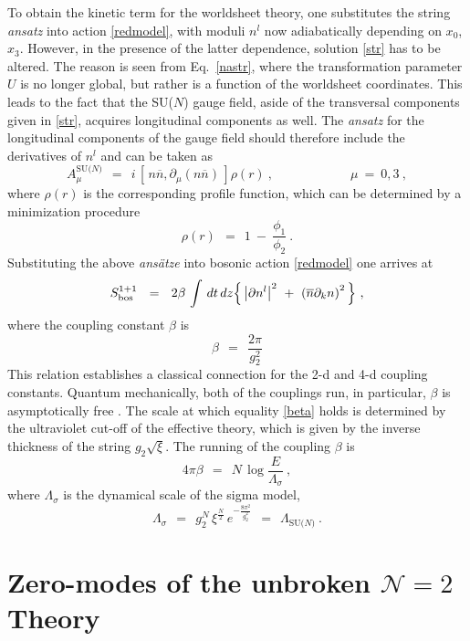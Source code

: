 \documentclass[12pt]{article}
\def\beq{\begin{equation}}
\def\eeq{\end{equation}}
\newcommand{\ntwo}{${\mathcal N}=2$ }
\newcommand{\p}{\partial}
\newcommand{\ov}{\overline}
\newcommand{\LN}{\Lambda_\text{SU($N$)}}
\newcommand{\nbar}{\ov{n}}
\begin{document}
	To obtain the kinetic term for the worldsheet theory, one substitutes the string {\it ansatz}
	into action \eqref{redmodel}, with moduli $ n^l $ now adiabatically
	depending on $ x_0 $, $ x_3 $.
	However, in the presence of the latter dependence, solution \eqref{str} has to be altered.
	The reason is seen from Eq.~\eqref{nastr}, where the transformation parameter 
	$ U $ is no longer global, but rather is a function of the worldsheet coordinates.
	This leads to the fact that the SU($N$) gauge field, aside of the transversal components
	given in \eqref{str}, acquires longitudinal components as well.
	The {\it ansatz} for the longitudinal components of the gauge field should
	therefore include the derivatives of $ n^l $ and can be taken as 
\[
	A_\mu^\text{SU($N$)} ~~=~~ i\, \left[\, n\nbar, \p_\mu(n\nbar)\, \right] \rho(r)~,   \qquad\qquad\qquad \mu~=~0, 3~,
\]
	where $ \rho(r) $ is the corresponding profile function, which can be determined by
	a minimization procedure \cite{SYrev}
\[
	\rho(r) ~~=~~ 1 ~-~ \frac{\phi_1}{\phi_2}~.
\]
	Substituting the above {\it ans\"{a}tze} into bosonic action \eqref{redmodel} one arrives
	at
\begin{align}
\label{cp}
	S_{\rm bos}^{1+1} ~~=~~ 2\beta\, \int\, dt\,dz 
					\Bigl\{\, \left|\p n^l\right|^2 
						  ~+~  \left(\nbar \p_k n\right)^2\,
					\Bigr\}~,
\end{align}
	where the coupling constant $ \beta $ is 
\beq
\label{beta}
	\beta ~~=~~ \frac{2\pi}{g_2^2}
\eeq
	This relation establishes a classical connection for the 2-d and 4-d coupling constants.
	Quantum mechanically, both of the couplings run, in particular, $ \beta $ is asymptotically
	free \cite{P75}.
	The scale at which equality \eqref{beta} holds is determined by the ultraviolet cut-off
	of the effective theory, which is given by the inverse thickness of the string $ g_2 \sqrt{\xi} $.
	The running of the coupling $ \beta $ is 
\beq
\label{asyfree}
	4 \pi \beta ~~=~~ N\,  \log \frac{E}{\Lambda_\sigma}~,
\eeq
	where $ \Lambda_\sigma $ is the dynamical scale of the sigma model, 
\beq
\label{lambdasig}
	\Lambda_\sigma ~~=~~ g_2^N\, \xi^{\frac{N}{2}}\, e^{-\frac{8\pi^2}{g_2^2}} ~~=~~ \LN~.
\eeq


%
%
\section{Zero-modes of the unbroken \boldmath\ntwo Theory}
\label{zeromodes}
\setcounter{equation}{0}
\end{document}
